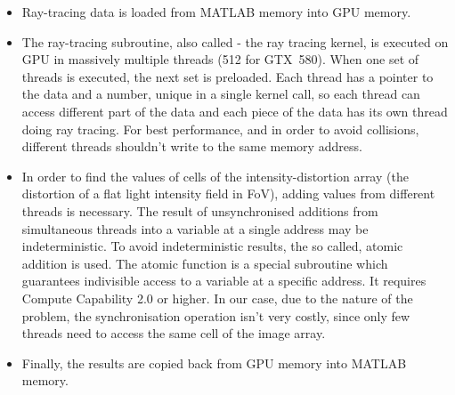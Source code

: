 \documentclass[preprint,review,12pt,dvips]{elsarticle}
\begin{document}
\begin{itemize}
\item Ray-tracing data is loaded from MATLAB memory into GPU memory.

\item The ray-tracing subroutine, also called - the ray tracing kernel, is executed on GPU in massively multiple threads
(512 for GTX~580). When one set of threads is executed, the next set is preloaded. Each thread has a pointer to the data
and a number, unique in a single kernel call, so each thread can access different part of the data and each piece of the
data has its own thread doing ray tracing. For best performance, and in order to avoid collisions, different threads
shouldn't write to the same memory address.

\item In order to find the values of cells of the intensity-distortion array (the distortion of a flat light intensity
field in FoV), adding values from different threads is necessary. The result of unsynchronised additions from simultaneous
threads into a variable at a single address may be indeterministic. To avoid indeterministic results, the so called,
atomic addition is used. The atomic function is a special subroutine which guarantees indivisible access to a variable at
a specific address. It requires Compute Capability 2.0 or higher. In our case, due to the nature of the problem, the
synchronisation operation isn't very costly, since only few threads need to access the same cell of the image array.

\item Finally, the results are copied back from GPU memory into MATLAB memory.
\end{itemize}
\end{document}
